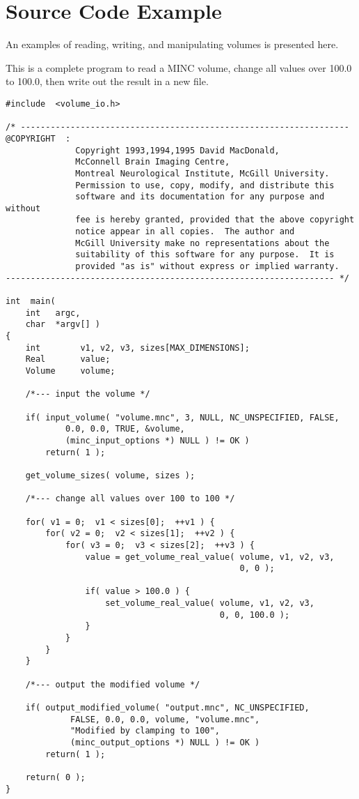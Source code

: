 \section{Source Code Example}

An examples of reading, writing, and manipulating volumes is
presented here.

This is a complete program to read a MINC volume, change all values
over 100.0 to 100.0, then write out the result in a new file.

{\small
\begin{verbatim}
#include  <volume_io.h>

/* ------------------------------------------------------------------
@COPYRIGHT  :
              Copyright 1993,1994,1995 David MacDonald,
              McConnell Brain Imaging Centre,
              Montreal Neurological Institute, McGill University.
              Permission to use, copy, modify, and distribute this
              software and its documentation for any purpose and without
              fee is hereby granted, provided that the above copyright
              notice appear in all copies.  The author and
              McGill University make no representations about the
              suitability of this software for any purpose.  It is
              provided "as is" without express or implied warranty.
------------------------------------------------------------------ */

int  main(
    int   argc,
    char  *argv[] )
{
    int        v1, v2, v3, sizes[MAX_DIMENSIONS];
    Real       value;
    Volume     volume;

    /*--- input the volume */

    if( input_volume( "volume.mnc", 3, NULL, NC_UNSPECIFIED, FALSE,
            0.0, 0.0, TRUE, &volume,
            (minc_input_options *) NULL ) != OK )
        return( 1 );

    get_volume_sizes( volume, sizes );

    /*--- change all values over 100 to 100 */

    for( v1 = 0;  v1 < sizes[0];  ++v1 ) {
        for( v2 = 0;  v2 < sizes[1];  ++v2 ) {
            for( v3 = 0;  v3 < sizes[2];  ++v3 ) {
                value = get_volume_real_value( volume, v1, v2, v3,
                                               0, 0 );

                if( value > 100.0 ) {
                    set_volume_real_value( volume, v1, v2, v3,
                                           0, 0, 100.0 );
                }
            }
        }
    }

    /*--- output the modified volume */

    if( output_modified_volume( "output.mnc", NC_UNSPECIFIED,
             FALSE, 0.0, 0.0, volume, "volume.mnc",
             "Modified by clamping to 100",
             (minc_output_options *) NULL ) != OK )
        return( 1 );

    return( 0 );
}
\end{verbatim}
}

